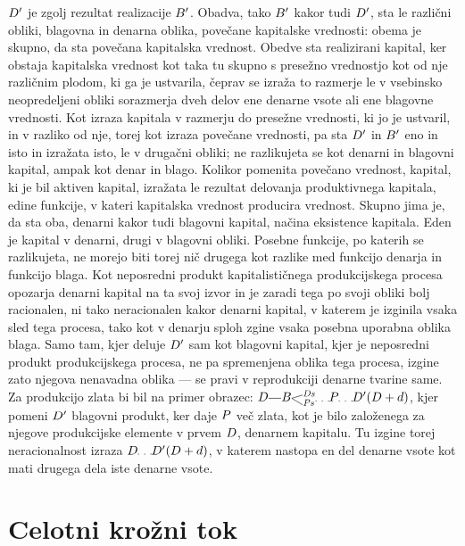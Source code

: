 \documentclass[kapital_02.tex]{subfiles}
\begin{document}
\(D'\) je zgolj rezultat realizacije \(B'\). Obadva, tako \(B'\) kakor tudi \(D'\), sta le različni obliki, blagovna in denarna oblika, povečane kapitalske vrednosti: obema je skupno, da sta povečana kapitalska vrednost. Obedve sta realizirani kapital, ker obstaja kapitalska vrednost kot taka tu skupno s presežno vrednostjo kot od nje različnim plodom, ki ga je ustvarila, čeprav se izraža to razmerje le v vsebinsko neopredeljeni obliki sorazmerja dveh delov ene denarne vsote ali ene blagovne vrednosti. Kot izraza kapitala v razmerju do presežne vrednosti, ki jo je ustvaril, in v razliko od nje, torej kot izraza povečane vrednosti, pa sta \(D'\) in \(B'\) eno in isto in izražata isto, le v drugačni obliki; ne razlikujeta se kot denarni in blagovni kapital, ampak kot denar in blago. Kolikor pomenita povečano vrednost, kapital, ki je bil aktiven kapital, izražata le rezultat delovanja produktivnega kapitala, edine funkcije, v kateri kapitalska vrednost producira vrednost. Skupno jima je, da sta oba, denarni kakor tudi blagovni kapital, načina eksistence kapitala. Eden je kapital v denarni, drugi v blagovni obliki. Posebne funkcije, po katerih se razlikujeta, ne morejo biti torej nič drugega kot razlike med funkcijo denarja in funkcijo blaga. Kot neposredni produkt kapitalističnega produkcijskega procesa opozarja denarni kapital na ta svoj izvor in je zaradi tega po svoji obliki bolj racionalen, ni tako neracionalen kakor denarni kapital, v katerem je izginila vsaka sled tega procesa, tako kot v denarju sploh zgine vsaka posebna uporabna oblika blaga. Samo tam, kjer deluje \(D'\) sam kot blagovni kapital, kjer je neposredni produkt produkcijskega procesa, ne pa spremenjena oblika tega procesa, izgine zato njegova nenavadna oblika --- se pravi v reprodukciji denarne tvarine same. Za produkcijo zlata bi bil na primer obrazec: \(\KPED\KPEcrta\KPEBrazcepDsPs\KPEpike\KPEP\KPEpike\KPED' (\KPED + \KPEd)\), kjer pomeni \(D'\) blagovni produkt, ker daje \(P\) več zlata, kot je bilo založenega za njegove produkcijske elemente v prvem \(D\), denarnem kapitalu. Tu izgine torej neracionalnost izraza \(\KPED\KPEpike\KPED' (\KPED + \KPEd)\), v katerem nastopa en del denarne vsote kot mati drugega dela iste denarne vsote.

\section{Celotni krožni tok}
\end{document}
